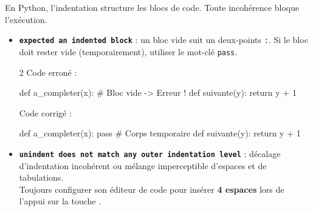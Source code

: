 \documentclass[11pt,a4paper]{article}
\begin{document}
\begin{tcolorbox}[left=0cm,title=\bf{\faBug \; 2. Erreurs d'indentation (IndentationError)},colbacktitle=cfond]
En Python, l'indentation structure les blocs de code. Toute incohérence bloque l'exécution.
\begin{itemize}
	\item[\textbullet] \textbf{\texttt{expected an indented block}} : un bloc vide suit un deux-points {\tt :}. Si le bloc doit rester vide (temporairement), utiliser le mot-clé \texttt{pass}.
	\setlength{\multicolsep}{0pt}
	\begin{multicols}{2}
		\textcolor{BrickRed}{\faTimesCircle \; Code erroné :}
		\begin{python}
def a_completer(x):
# Bloc vide -> Erreur !
def suivante(y):
    return y + 1
		\end{python}
		\textcolor{OliveGreen}{\faCheckCircle \; Code corrigé :}
		\begin{python}
def a_completer(x):
    pass  # Corps temporaire
def suivante(y):
    return y + 1
		\end{python}
	\end{multicols}

	\item[\textbullet] \textbf{\texttt{unindent does not match any outer indentation level}} : décalage d'indentation incohérent ou mélange imperceptible d'espaces et de tabulations. \\
	{\small \important} Toujours configurer son éditeur de code pour insérer \textbf{4 espaces} lors de l'appui sur la touche \keys{\tab}.
\end{itemize}
\end{tcolorbox}
\end{document}
